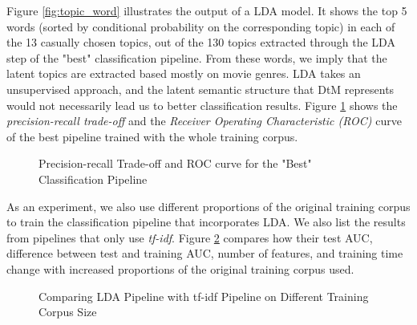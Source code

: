 \documentclass{article}
\begin{document}
Figure \ref{fig:topic_word} illustrates the output of a LDA model. It shows the top 5 words (sorted by conditional probability on the corresponding topic) in each of the 13 casually chosen topics, out of the 130 topics extracted through the LDA step of the "best" classification pipeline. From these words, we imply that the latent topics are extracted based mostly on movie genres. LDA takes an unsupervised approach, and the latent semantic structure that DtM represents would not necessarily lead us to better classification results. Figure \ref{fig:pr_roc} shows the \emph{precision-recall trade-off} and the \emph{Receiver Operating Characteristic (ROC)} curve of the best pipeline trained with the whole training corpus.

\begin{figure}[h!]
  \centering
  \caption{Precision-recall Trade-off and ROC curve for the "Best" Classification Pipeline}
  \label{fig:pr_roc}
\end{figure}

As an experiment, we also use different proportions of the original training corpus to train the classification pipeline that incorporates LDA. We also list the results from pipelines that only use \emph{tf-idf}. Figure \ref{fig:comp} compares how their test AUC, difference between test and training AUC, number of features, and training time change with increased proportions of the original training corpus used.

\begin{figure}[h!]
  \centering
  \caption{Comparing LDA Pipeline with tf-idf Pipeline on Different Training Corpus Size}
  \label{fig:comp}
\end{figure}
\end{document}

